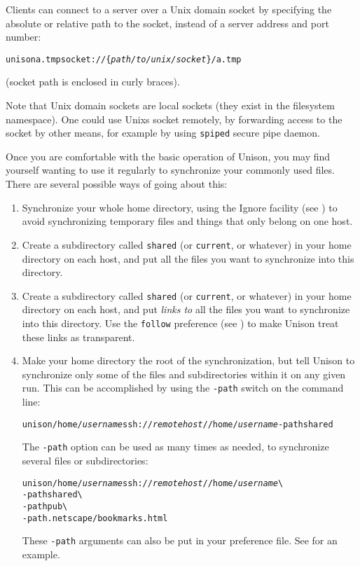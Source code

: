 \documentclass{article}
\newcommand{\NT}[1]{\textit{#1}}
\begin{document}
Clients can connect to a server over a Unix domain socket by specifying
the absolute or relative path to the socket, instead of a server address
and port number:
\begin{alltt}
       unison a.tmp socket://\{\NT{path/to/unix/socket}\}/a.tmp
\end{alltt}
(socket path is enclosed in curly braces).

Note that Unix domain sockets are local sockets (they exist in the
filesystem namespace).
One could use Unixs socket remotely, by forwarding access to the
socket by other means, for example by using {\tt spiped} secure pipe
daemon.


Once you are comfortable with the basic operation of Unison, you may
find yourself wanting to use it regularly to synchronize your commonly
used files.  There are several possible ways of going about this:

\begin{enumerate}
\item Synchronize your whole home directory, using the Ignore facility
(see )
to avoid synchronizing temporary files and things that only belong on
one host.
\item Create a subdirectory called {\tt shared} (or {\tt current}, or
whatever) in your home directory on each host, and put all the files
you want to synchronize into this directory.
\item Create a subdirectory called {\tt shared} (or {\tt current}, or
whatever) in your home directory on each host, and put {\em links to}
all the files you want to synchronize into this directory.  Use the
{\tt follow} preference (see ) to make
Unison treat these links as transparent.
\item Make your home directory the root of the synchronization, but
tell Unison to synchronize only some of the files and subdirectories
within it on any given run.  This can be accomplished by using the {\tt -path} switch
on the command line:
\begin{alltt}
       unison /home/\NT{username} ssh://\NT{remotehost}//home/\NT{username} -path shared
\end{alltt}
The {\tt -path} option can be used as many times as needed, to
synchronize several files or subdirectories:
\begin{alltt}
       unison /home/\NT{username} ssh://\NT{remotehost}//home/\NT{username} \verb|\|
          -path shared \verb|\|
          -path pub \verb|\|
          -path .netscape/bookmarks.html
\end{alltt}
These \verb|-path| arguments can also be put in your preference file.
See  for an example.
\end{enumerate}
\end{document}

